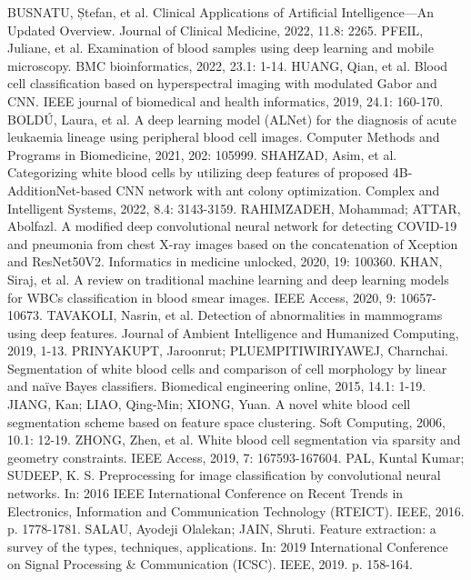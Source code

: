 \documentclass[conference]{IEEEtran}
\begin{document}
\begin{thebibliography}{00}
 BUSNATU, Ștefan, et al. Clinical Applications of Artificial Intelligence—An Updated Overview. Journal of Clinical Medicine, 2022, 11.8: 2265.
 PFEIL, Juliane, et al. Examination of blood samples using deep learning and mobile microscopy. BMC bioinformatics, 2022, 23.1: 1-14.
 HUANG, Qian, et al. Blood cell classification based on hyperspectral imaging with modulated Gabor and CNN. IEEE journal of biomedical and health informatics, 2019, 24.1: 160-170.
 BOLDÚ, Laura, et al. A deep learning model (ALNet) for the diagnosis of acute leukaemia lineage using peripheral blood cell images. Computer Methods and Programs in Biomedicine, 2021, 202: 105999.
 SHAHZAD, Asim, et al. Categorizing white blood cells by utilizing deep features of proposed 4B-AdditionNet-based CNN network with ant colony optimization. Complex and Intelligent Systems, 2022, 8.4: 3143-3159.
 RAHIMZADEH, Mohammad; ATTAR, Abolfazl. A modified deep convolutional neural network for detecting COVID-19 and pneumonia from chest X-ray images based on the concatenation of Xception and ResNet50V2. Informatics in medicine unlocked, 2020, 19: 100360.
 KHAN, Siraj, et al. A review on traditional machine learning and deep learning models for WBCs classification in blood smear images. IEEE Access, 2020, 9: 10657-10673.
 TAVAKOLI, Nasrin, et al. Detection of abnormalities in mammograms using deep features. Journal of Ambient Intelligence and Humanized Computing, 2019, 1-13. 
 PRINYAKUPT, Jaroonrut; PLUEMPITIWIRIYAWEJ, Charnchai. Segmentation of white blood cells and comparison of cell morphology by linear and naïve Bayes classifiers. Biomedical engineering online, 2015, 14.1: 1-19. 
 JIANG, Kan; LIAO, Qing-Min; XIONG, Yuan. A novel white blood cell segmentation scheme based on feature space clustering. Soft Computing, 2006, 10.1: 12-19.
 ZHONG, Zhen, et al. White blood cell segmentation via sparsity and geometry constraints. IEEE Access, 2019, 7: 167593-167604.
 PAL, Kuntal Kumar; SUDEEP, K. S. Preprocessing for image classification by convolutional neural networks. In: 2016 IEEE International Conference on Recent Trends in Electronics, Information and Communication Technology (RTEICT). IEEE, 2016. p. 1778-1781.
 SALAU, Ayodeji Olalekan; JAIN, Shruti. Feature extraction: a survey of the types, techniques, applications. In: 2019 International Conference on Signal Processing \& Communication (ICSC). IEEE, 2019. p. 158-164.

\end{thebibliography}
\end{document}
